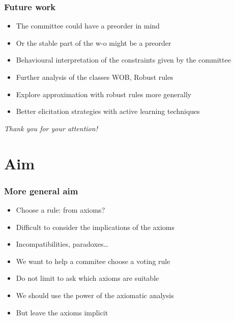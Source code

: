 \documentclass[english]{beamer}
\begin{document}
\begin{frame}
	\frametitle{Future work}
	\begin{itemize}
		\item The committee could have a preorder in mind
		\item Or the stable part of the w-o might be a preorder
		\item Behavioural interpretation of the constraints given by the committee
		\item Further analysis of the classes WOB, Robust rules
		\item Explore approximation with robust rules more generally
		\item Better elicitation strategies with active learning techniques
	\end{itemize}
\end{frame}

\begin{frame}[plain]
	\addtocounter{framenumber}{-1}
	\begin{center}
		\huge
		\textit{Thank you for your attention!}
	\end{center}
\end{frame}

\appendix
\AtBeginSection{
}

\clearpage{}
\begin{frame}[allowframebreaks]
	\frametitle{\refname}
 	
\end{frame}

\section{Aim}
\begin{frame}
	\frametitle{More general aim}
	\begin{itemize}
		\item Choose a rule: from axioms?
		\item Difficult to consider the implications of the axioms
		\item Incompatibilities, paradoxes…
		\item We want to help a commitee choose a voting rule
		\item Do not limit to ask which axioms are suitable
		\item We should use the power of the axiomatic analysis
		\item But leave the axioms implicit
	\end{itemize}
\end{frame}
\end{document}
